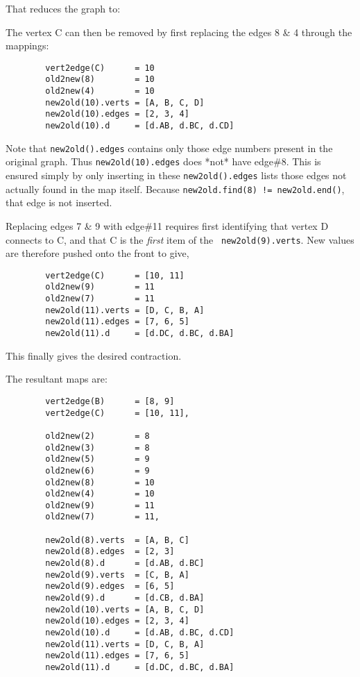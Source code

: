 \begin{spacing}{1.5}
    That reduces the graph to:

    

    The vertex C can then be removed by first replacing the edges 8 \& 4 through the mappings:
    \begin{lstlisting}
        vert2edge(C)      = 10
        old2new(8)        = 10
        old2new(4)        = 10
        new2old(10).verts = [A, B, C, D]
        new2old(10).edges = [2, 3, 4]
        new2old(10).d     = [d.AB, d.BC, d.CD]
    \end{lstlisting}
    Note that {\tt new2old().edges} contains only those edge numbers present in the original graph. Thus {\tt new2old(10).edges} does *not* have
    edge\#8. This is ensured simply by only inserting in these {\tt new2old().edges} lists those edges not actually found in the map itself.
    Because {\tt new2old.find(8) != new2old.end()}, that edge is not inserted.

    Replacing edges 7 \& 9 with edge\#11 requires first identifying that vertex D connects to C, and that C is the {\it first} item of the {\tt
    new2old(9).verts}. New values are therefore pushed onto the front to give,
    \begin{lstlisting}
        vert2edge(C)      = [10, 11]
        old2new(9)        = 11
        old2new(7)        = 11
        new2old(11).verts = [D, C, B, A]
        new2old(11).edges = [7, 6, 5]
        new2old(11).d     = [d.DC, d.BC, d.BA]
    \end{lstlisting}

    \pagebreak
    This finally gives the desired contraction.

    

    The resultant maps are:
    \begin{lstlisting}
        vert2edge(B)      = [8, 9]
        vert2edge(C)      = [10, 11],

        old2new(2)        = 8
        old2new(3)        = 8
        old2new(5)        = 9
        old2new(6)        = 9
        old2new(8)        = 10
        old2new(4)        = 10
        old2new(9)        = 11
        old2new(7)        = 11,

        new2old(8).verts  = [A, B, C]
        new2old(8).edges  = [2, 3]
        new2old(8).d      = [d.AB, d.BC]
        new2old(9).verts  = [C, B, A]
        new2old(9).edges  = [6, 5]
        new2old(9).d      = [d.CB, d.BA]
        new2old(10).verts = [A, B, C, D]
        new2old(10).edges = [2, 3, 4]
        new2old(10).d     = [d.AB, d.BC, d.CD]
        new2old(11).verts = [D, C, B, A]
        new2old(11).edges = [7, 6, 5]
        new2old(11).d     = [d.DC, d.BC, d.BA]
    \end{lstlisting}


\end{spacing}
